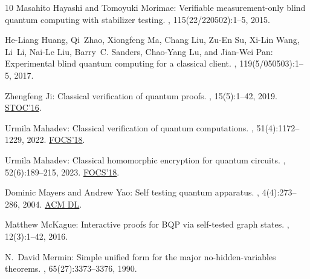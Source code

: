\documentclass[11pt]{article}
\numberwithin{equation}{section}
\theoremstyle{definition}
\theoremstyle{plain}
\begin{document}
\begin{thebibliography}{10}
{\sc Masahito Hayashi and Tomoyuki Morimae}: Verifiable measurement-only blind
  quantum computing with stabilizer testing.
, 115(22/220502):1--5, 2015.

{\sc He-Liang Huang, Qi~Zhao, Xiongfeng Ma, Chang Liu, Zu-En Su, Xi-Lin Wang,
  Li~Li, Nai-Le Liu, Barry~C. Sanders, Chao-Yang Lu, and Jian-Wei Pan}:
  Experimental blind quantum computing for a classical client.
, 119(5/050503):1--5, 2017.

{\sc Zhengfeng Ji}: Classical verification of quantum proofs.
, 15(5):1--42, 2019.
\newblock \prelim \href{https://doi.org/10.1145/2897518.2897634}{STOC'16}.

{\sc Urmila Mahadev}: Classical verification of quantum computations.
, 51(4):1172--1229, 2022.
\newblock \prelim \href{https://doi.org/10.1109/FOCS.2018.00033}{FOCS'18}.

{\sc Urmila Mahadev}: Classical homomorphic encryption for quantum circuits.
, 52(6):189--215, 2023.
\newblock \prelim \href{https://doi.org/10.1109/FOCS.2018.00039}{FOCS'18}.

{\sc Dominic Mayers and Andrew Yao}: Self testing quantum apparatus.
, 4(4):273--286, 2004.
\newblock \href{https://dl.acm.org/doi/10.5555/2011827.2011830}{ACM DL}.

{\sc Matthew McKague}: Interactive proofs for {BQP} via self-tested graph
  states.
, 12(3):1--42, 2016.

{\sc N.~David Mermin}: Simple unified form for the major no-hidden-variables
  theorems.
, 65(27):3373--3376, 1990.


\end{thebibliography}
\end{document}
